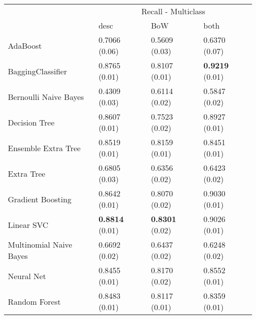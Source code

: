 \begin{tabular}{|l|l|l|l| }
\hline
 &  \multicolumn{3}{c|}{ Recall - Multiclass} \\
\cline{2-4} & desc & BoW & both \\ \hline
AdaBoost                & 0.7066 (0.06) & 0.5609 (0.03) & 0.6370 (0.07)\\
BaggingClassifier       & 0.8765 (0.01) & 0.8107 (0.01) & {\bf 0.9219} (0.01)\\
Bernoulli Naive Bayes   & 0.4309 (0.03) & 0.6114 (0.02) & 0.5847 (0.02)\\
Decision Tree           & 0.8607 (0.01) & 0.7523 (0.02) & 0.8927 (0.01)\\
Ensemble Extra Tree     & 0.8519 (0.01) & 0.8159 (0.01) & 0.8451 (0.01)\\
Extra Tree              & 0.6805 (0.03) & 0.6356 (0.02) & 0.6423 (0.02)\\
Gradient Boosting       & 0.8642 (0.01) & 0.8070 (0.02) & 0.9030 (0.01)\\
Linear SVC              & {\bf 0.8814} (0.01) & {\bf 0.8301} (0.02) & 0.9026 (0.01)\\
Multinomial Naive Bayes & 0.6692 (0.02) & 0.6437 (0.02) & 0.6248 (0.02)\\
Neural Net              & 0.8455 (0.01) & 0.8170 (0.02) & 0.8552 (0.01)\\
Random Forest           & 0.8483 (0.01) & 0.8117 (0.01) & 0.8359 (0.01)\\
\hline
\end{tabular}
